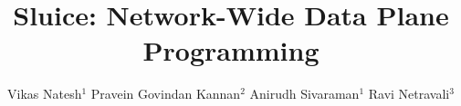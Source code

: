 \documentclass[sigconf]{acmart}
\begin{document}
\title{	Sluice: Network-Wide Data Plane Programming\vspace{-10mm}}


\author{Vikas Natesh$^{ 1}$ \space \space    Pravein Govindan Kannan$^{ 2}$  \space \space Anirudh Sivaraman$^{ 1}$  \space \space Ravi Netravali$^{ 3}$}

\renewcommand{\shortauthors}{V. Natesh. et al.}


\maketitle





\end{document}
